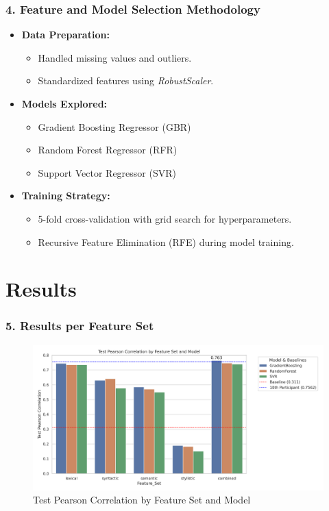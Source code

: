 \documentclass{beamer}
\begin{document}
\begin{frame}
  \frametitle{4. Feature and Model Selection Methodology}
  \begin{itemize}
    \item \textbf{Data Preparation:}
    \begin{itemize}
      \item Handled missing values and outliers.
      \item Standardized features using \textit{RobustScaler}.
    \end{itemize}
    \vspace{0.5cm}
    \item \textbf{Models Explored:}
    \begin{itemize}
      \item Gradient Boosting Regressor (GBR)
      \item Random Forest Regressor (RFR)
      \item Support Vector Regressor (SVR)
    \end{itemize}
    \vspace{0.5cm}
    \item \textbf{Training Strategy:}
    \begin{itemize}
      \item 5-fold cross-validation with grid search for hyperparameters.
      \item Recursive Feature Elimination (RFE) during model training.
    \end{itemize}
  \end{itemize}
\end{frame}

\section{Results}

\begin{frame}
  \frametitle{5. Results per Feature Set}
  \begin{figure}
    \centering
    \includegraphics[width=\linewidth]{img/Test_Pearson_Correlation_by_Feature_Set_and_Model.png}
    \caption{Test Pearson Correlation by Feature Set and Model}
  \end{figure}
\end{frame}
\end{document}
